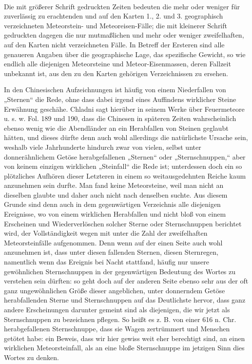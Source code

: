 \documentclass[a4paper, 8pt, oneside, polutonikogreek, german]{article}
\begin{document}
\paragraph{}
Die mit größerer Schrift gedruckten Zeiten bedeuten die mehr oder weniger für zuverlässig zu erachtenden und auf den Karten 1., 2. und 3. geographisch verzeichneten Meteorstein- und Meteoreisen-Fälle; die mit kleinerer Schrift gedruckten dagegen die nur mutmaßlichen und mehr oder weniger zweifelhaften, auf den Karten nicht verzeichneten Fälle. In Betreff der Ersteren sind alle genaueren Angaben über die geographische Lage, das spezifische Gewicht, so wie endlich alle diejenigen Meteorsteine und Meteor-Eisenmassen, deren Fallzeit unbekannt ist, aus den zu den Karten gehörigen Verzeichnissen zu ersehen.

In den Chinesischen Aufzeichnungen ist häufig von einem Niederfallen von „Sternen“ die Rede, ohne dass dabei irgend eines Auffindens wirklicher Steine Erwähnung geschähe. Chladni sagt hierüber in seinem Werke über Feuermeteore u. s. w. Fol. 189 und 190, dass die Chinesen in späteren Zeiten wahrscheinlich ebenso wenig wie die Abendländer an ein Herabfallen von Steinen geglaubt hätten, und dieses dürfte denn auch wohl allerdings die natürlichste Ursache sein, weshalb viele Jahrhunderte hindurch zwar von vielen, selbst unter donnerähnlichem Getöse herabgefallenen „Sternen“ oder „Sternschnuppen,“ aber von keinem einzigen wirklichen „Steinfall“ die Rede ist; unterdessen doch ein so plötzliches Aufhören dieser Letzteren in einem so weitausgedehnten Reiche kaum anzunehmen sein durfte. Man fand keine Meteorsteine, weil man nicht an dieselben glaubte und daher auch nicht nach denselben suchte. Aus diesem Grunde sind denn auch in dem gegenwärtigen Verzeichnis alle diejenigen Ereignisse, wo von einem wirklichen Herabfallen und nicht bloß von einem Erscheinen und Wiederverlöschen solcher Sterne oder Sternschnuppen berichtet wird, der Vollständigkeit wegen mit unter die Zahl der zweifelhaften Meteorsteinfälle aufgenommen. Denn wenn auf der einen Seite auch wohl anzunehmen ist, dass unter diesen fallenden Sternen, diesen Sternregen, namentlich wenn das Ereignis bei Nacht stattfand, häufig nur unsere gewöhnlichen Sternschnuppen in der gegenwärtigen Bedeutung des Wortes zu verstehen sein dürften: so geht doch auf der anderen Seite ebenso sehr aus der oft ganz ungewöhnlichen Größe dieser angeblichen, unter donnerndem Getöse herabfallenden Sterne und Sternschnuppen auf das Deutlichste hervor, dass ganz andere Erscheinungen darunter gemeint sind als diejenigen, die wir jetzt als Sternschnuppen zu bezeichnen pflegen. So heißt es z. B. von einer 616 n. Chr. herabgefallenen Sternschnuppe, dass sie Wagen zertrümmert und Menschen getötet habe: ein Beweis, dass wir hier gewiss weit eher berechtigt sind, an einen wirklichen Meteorsteinfall, als an eine bloße Sternschnuppe im jetzigen Sinn dies Wortes zu denken.
\end{document}
